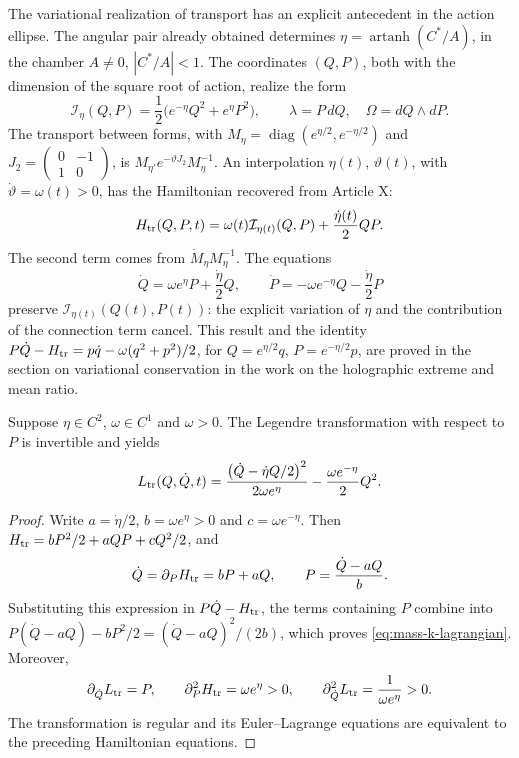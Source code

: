 The variational realization of transport has an explicit antecedent
in the action ellipse. The angular pair already obtained determines
\(\eta=\operatorname{artanh}(C^*/A)\), in the chamber
\(A\ne0\), \(|C^*/A|<1\). The coordinates \((Q,P)\), both with
the dimension of the square root of action, realize the form
\[
 \mathcal I_\eta(Q,P)=\frac12\bigl(e^{-\eta}Q^2+e^\eta P^2\bigr),
 \qquad \lambda=P\,dQ,\quad \Omega=dQ\wedge dP.
\]
The transport between forms, with
\(M_\eta=\operatorname{diag}(e^{\eta/2},e^{-\eta/2})\) and
\(J_2=\left(\begin{smallmatrix}0&-1\\1&0\end{smallmatrix}\right)\),
is \(M_{\eta'}e^{-\vartheta J_2}M_\eta^{-1}\). An
interpolation \(\eta(t)\), \(\vartheta(t)\), with
\(\dot\vartheta=\omega(t)>0\), has the Hamiltonian recovered
from Article X:
\begin{equation}
 H_{\rm tr}(Q,P,t)=\omega(t)\mathcal I_{\eta(t)}(Q,P)
                 +\frac{\dot\eta(t)}2QP.
 \label{eq:mass-k-hamiltonian}
\end{equation}
The second term comes from \(\dot M_\eta M_\eta^{-1}\).
The equations
\[
 \dot Q=\omega e^\eta P+\frac{\dot\eta}2Q,
 \qquad
 \dot P=-\omega e^{-\eta}Q-\frac{\dot\eta}2P
\]
preserve \(\mathcal I_{\eta(t)}(Q(t),P(t))\): the explicit
variation of \(\eta\) and the contribution of the connection term
cancel. This result and the identity
\(P\dot Q-H_{\rm tr}=p\dot q-\omega(q^2+p^2)/2\), for
\(Q=e^{\eta/2}q\), \(P=e^{-\eta/2}p\), are proved
in the section on variational conservation in the work on the holographic
extreme and mean ratio.

\begin{proposition}
Suppose \(\eta\in C^2\), \(\omega\in C^1\) and \(\omega>0\).
The Legendre transformation with respect to \(P\) is invertible and
yields
\begin{equation}
 L_{\rm tr}(Q,\dot Q,t)=
 \frac{\bigl(\dot Q-\dot\eta Q/2\bigr)^2}{2\omega e^\eta}
 -\frac{\omega e^{-\eta}}2Q^2.
 \label{eq:mass-k-lagrangian}
\end{equation}
\end{proposition}
\begin{proof}
Write \(a=\dot\eta/2\), \(b=\omega e^\eta>0\) and
\(c=\omega e^{-\eta}\). Then
\(H_{\rm tr}=bP^2/2+aQP+cQ^2/2\), and
\[
 \dot Q=\partial_PH_{\rm tr}=bP+aQ,
 \qquad P=\frac{\dot Q-aQ}{b}.
\]
Substituting this expression in \(P\dot Q-H_{\rm tr}\), the
terms containing \(P\) combine into
\(P(\dot Q-aQ)-bP^2/2=(\dot Q-aQ)^2/(2b)\), which
proves \eqref{eq:mass-k-lagrangian}. Moreover,
\[
 \partial_{\dot Q}L_{\rm tr}=P,
 \qquad
 \partial_P^2H_{\rm tr}=\omega e^\eta>0,
 \qquad
 \partial_{\dot Q}^2L_{\rm tr}=\frac1{\omega e^\eta}>0.
\]
The transformation is regular and its Euler--Lagrange equations
are equivalent to the preceding Hamiltonian equations.
\end{proof}

